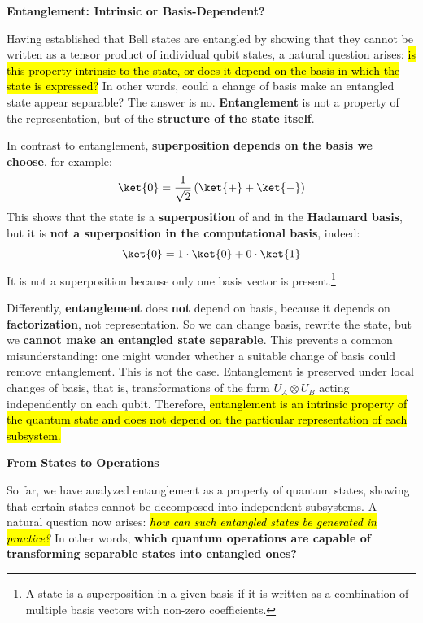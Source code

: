 \begin{flushleft}
    \label{question:entanglement-intrinsic-or-basis-dependent}
    \textcolor{Green3}{ \textbf{Entanglement: Intrinsic or Basis-Dependent?}}
\end{flushleft}
Having established that Bell states are entangled by showing that they cannot be written as a tensor product of individual qubit states, a natural question arises: \hl{is this property intrinsic to the state, or does it depend on the basis in which the state is expressed?} In other words, could a change of basis make an entangled state appear separable? The answer is no. \textbf{Entanglement} is not a property of the representation, but of the \textbf{structure of the state itself}.

\highspace
In contrast to entanglement, \textbf{superposition depends on the basis we choose}, for example:
\begin{equation*}
    \ket{0} = \frac{1}{\sqrt{2}}\left(\ket{+} + \ket{-}\right)
\end{equation*}
This shows that the state  is a \textbf{superposition} of \ket{+} and \ket{-} in the \textbf{Hadamard basis}, but it is \textbf{not a superposition in the computational basis}, indeed:
\begin{equation*}
    \ket{0} = 1 \cdot \ket{0} + 0 \cdot \ket{1}
\end{equation*}
It is not a superposition because only one basis vector is present.\footnote{A state is a superposition in a given basis if it is written as a combination of multiple basis vectors with non-zero coefficients.}

\highspace
Differently, \textbf{entanglement} does \textbf{not} depend on basis, because it depends on \textbf{factorization}, not representation. So we can change basis, rewrite the state, but we \textbf{cannot make an entangled state separable}. This prevents a common misunderstanding: one might wonder whether a suitable change of basis could remove entanglement. This is not the case. Entanglement is preserved under local changes of basis, that is, transformations of the form $U_A \otimes U_B$ acting independently on each qubit. Therefore, \hl{entanglement is an intrinsic property of the quantum state and does not depend on the particular representation of each subsystem.}

\highspace
\begin{flushleft}
    \textcolor{Green3}{ \textbf{From States to Operations}}
\end{flushleft}
So far, we have analyzed entanglement as a property of quantum states, showing that certain states cannot be decomposed into independent subsystems. A natural question now arises: \hl{\emph{how can such entangled states be generated in practice?}} In other words, \textbf{which quantum operations are capable of transforming separable states into entangled ones?}

